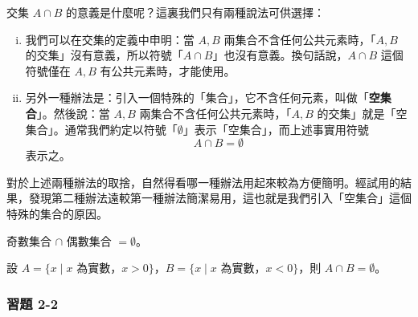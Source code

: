 \begin{enumerate}[(一)]
  交集 $A \cap B$ 的意義是什麼呢？這裏我們只有兩種說法可供選擇：
  \begin{enumerate}[(i)]
    \item 我們可以在交集的定義中申明：當 $A, B$ 兩集合不含任何公共元素時，「$A, B$ 的交集」沒有意義，所以符號「$A \cap B$」也沒有意義。換句話說，$A \cap B$ 這個符號僅在 $A, B$ 有公共元素時，才能使用。
    \item 另外一種辦法是：引入一個特殊的「集合」，它不含任何元素，叫做「\textbf{空集合}」。然後說：當 $A, B$ 兩集合不含任何公共元素時，「$A, B$ 的交集」就是「空集合」。通常我們約定以符號「$\emptyset$」表示「空集合」，而上述事實用符號
    \begin{equation}\label{eq:disjoint_empty}
      A \cap B = \emptyset
    \end{equation}
    表示之。
  \end{enumerate}
  對於上述兩種辦法的取捨，自然得看哪一種辦法用起來較為方便簡明。經試用的結果，發現第二種辦法遠較第一種辦法簡潔易用，這也就是我們引入「空集合」這個特殊的集合的原因。

  \begin{example}\label{ex:2-3-8}
  奇數集合 $\cap$ 偶數集合 $= \emptyset$。
  \end{example}

  \begin{example}\label{ex:2-3-9}
  設 $A = \{x \mid x \text{ 為實數，} x > 0\}$，$B = \{x \mid x \text{ 為實數，} x < 0\}$，則 $A \cap B = \emptyset$。
  \end{example}
\end{enumerate}

\subsubsection*{習題 2-2}\label{sec:ex2-2}

